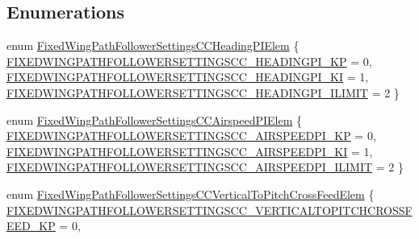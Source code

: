 \subsection*{\-Enumerations}
\begin{DoxyCompactItemize}
\item 
enum \hyperlink{group___fixed_wing_path_follower_settings_c_c_ga1c4ef17f7e8b90f83052d65d68e87a1c}{\-Fixed\-Wing\-Path\-Follower\-Settings\-C\-C\-Heading\-P\-I\-Elem} \{ \hyperlink{group___fixed_wing_path_follower_settings_c_c_gga1c4ef17f7e8b90f83052d65d68e87a1ca3fc420314c4190a99a15b88a222cc795}{\-F\-I\-X\-E\-D\-W\-I\-N\-G\-P\-A\-T\-H\-F\-O\-L\-L\-O\-W\-E\-R\-S\-E\-T\-T\-I\-N\-G\-S\-C\-C\-\_\-\-H\-E\-A\-D\-I\-N\-G\-P\-I\-\_\-\-K\-P} = 0, 
\hyperlink{group___fixed_wing_path_follower_settings_c_c_gga1c4ef17f7e8b90f83052d65d68e87a1ca2b7e2273e4e54001cf293c9fc182845c}{\-F\-I\-X\-E\-D\-W\-I\-N\-G\-P\-A\-T\-H\-F\-O\-L\-L\-O\-W\-E\-R\-S\-E\-T\-T\-I\-N\-G\-S\-C\-C\-\_\-\-H\-E\-A\-D\-I\-N\-G\-P\-I\-\_\-\-K\-I} = 1, 
\hyperlink{group___fixed_wing_path_follower_settings_c_c_gga1c4ef17f7e8b90f83052d65d68e87a1cab9fe92fc46ae666224b33391da01c057}{\-F\-I\-X\-E\-D\-W\-I\-N\-G\-P\-A\-T\-H\-F\-O\-L\-L\-O\-W\-E\-R\-S\-E\-T\-T\-I\-N\-G\-S\-C\-C\-\_\-\-H\-E\-A\-D\-I\-N\-G\-P\-I\-\_\-\-I\-L\-I\-M\-I\-T} = 2
 \}
\item 
enum \hyperlink{group___fixed_wing_path_follower_settings_c_c_ga831d948329ddf34d549a3c41f37c79ed}{\-Fixed\-Wing\-Path\-Follower\-Settings\-C\-C\-Airspeed\-P\-I\-Elem} \{ \hyperlink{group___fixed_wing_path_follower_settings_c_c_gga831d948329ddf34d549a3c41f37c79edadeebba449f9382bb6c6d2cc6d6d1221c}{\-F\-I\-X\-E\-D\-W\-I\-N\-G\-P\-A\-T\-H\-F\-O\-L\-L\-O\-W\-E\-R\-S\-E\-T\-T\-I\-N\-G\-S\-C\-C\-\_\-\-A\-I\-R\-S\-P\-E\-E\-D\-P\-I\-\_\-\-K\-P} = 0, 
\hyperlink{group___fixed_wing_path_follower_settings_c_c_gga831d948329ddf34d549a3c41f37c79edac53792ff6efaf06adff580ebcd14463a}{\-F\-I\-X\-E\-D\-W\-I\-N\-G\-P\-A\-T\-H\-F\-O\-L\-L\-O\-W\-E\-R\-S\-E\-T\-T\-I\-N\-G\-S\-C\-C\-\_\-\-A\-I\-R\-S\-P\-E\-E\-D\-P\-I\-\_\-\-K\-I} = 1, 
\hyperlink{group___fixed_wing_path_follower_settings_c_c_gga831d948329ddf34d549a3c41f37c79eda80abad93989681b7f9f63dbb738a7686}{\-F\-I\-X\-E\-D\-W\-I\-N\-G\-P\-A\-T\-H\-F\-O\-L\-L\-O\-W\-E\-R\-S\-E\-T\-T\-I\-N\-G\-S\-C\-C\-\_\-\-A\-I\-R\-S\-P\-E\-E\-D\-P\-I\-\_\-\-I\-L\-I\-M\-I\-T} = 2
 \}
\item 
enum \hyperlink{group___fixed_wing_path_follower_settings_c_c_gae00bad2eb48611ca6d31ef42f48eb641}{\-Fixed\-Wing\-Path\-Follower\-Settings\-C\-C\-Vertical\-To\-Pitch\-Cross\-Feed\-Elem} \{ \hyperlink{group___fixed_wing_path_follower_settings_c_c_ggae00bad2eb48611ca6d31ef42f48eb641ac79779d0d3d64a59dafc719f3c387a78}{\-F\-I\-X\-E\-D\-W\-I\-N\-G\-P\-A\-T\-H\-F\-O\-L\-L\-O\-W\-E\-R\-S\-E\-T\-T\-I\-N\-G\-S\-C\-C\-\_\-\-V\-E\-R\-T\-I\-C\-A\-L\-T\-O\-P\-I\-T\-C\-H\-C\-R\-O\-S\-S\-F\-E\-E\-D\-\_\-\-K\-P} = 0, 

\end{DoxyCompactItemize}
